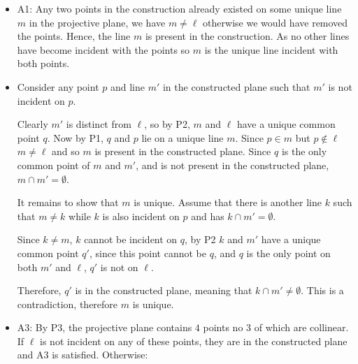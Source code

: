 \documentclass[a4paper, 11pt]{article}
\begin{document}
\begin{itemize}
	\item
		 A1: Any two points in the construction already existed on some unique line $m$ in the projective plane, we have $m\neq\ell$ otherwise we would have removed the points. Hence, the line $m$ is present in the construction. As no other lines have become incident with the points so $m$ is the unique line incident with both points.  

	\item 
		Consider any point $p$ and line $m'$ in the constructed plane such that $m'$ is not incident on $p$. 

		Clearly $m'$ is distinct from $\ell$, so by P2, $m$ and $\ell$ have a unique common point $q$. Now by P1, $q$ and $p$ lie on a unique line $m$. Since $p\in m$ but $p\notin\ell$ $m\neq\ell$ and so $m$ is present in the constructed plane. Since $q$ is the only common point of $m$ and $m'$, and is not present in the constructed plane, $m\cap m'=\emptyset$. 

		\begin{center}
		\end{center}

		It remains to show that $m$ is unique. Assume that there is another line $k$ such that $m\neq k$ while $k$ is also incident on $p$ and has $k\cap m'=\emptyset$.

		Since $k\neq m$, $k$ cannot be incident on $q$, by P2 $k$ and $m'$ have a unique common point $q'$, since this point cannot be $q$, and $q$ is the only point on both $m'$ and $\ell$, $q'$ is not on $\ell$. 

		Therefore, $q'$ is in the constructed plane, meaning that $k\cap m'\neq \emptyset$. This is a contradiction, therefore $m$ is unique. 

	\item 
		A3: By P3, the projective plane contains $4$ points no $3$ of which are collinear. If $\ell$ is not incident on any of these points, they are in the constructed plane and A3 is satisfied. Otherwise: 
	

\end{itemize}
\end{document}
